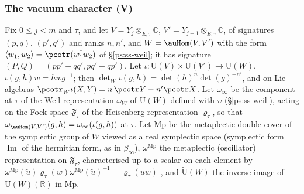\documentclass[10pt]{amsart}
\theoremstyle{definition}
\theoremstyle{remark}
\newcommand{\C}{\mathbb C}
\newcommand{\R}{\mathbb R}
\newcommand{\Iml}{\operatorname{Im}}
\providecommand{\auU}{\mathrm U}
\begin{document}
\subsubsection{The vacuum character (V)}\label{pco:ss-V}
Fix $0\le j<m$ and $\tau$, and let $V=Y_j\otimes_{E,\tau}\C$, $V'=Y_{j+1}\otimes_{E,\tau}\C$, of
signatures $(p,q)$, $(p',q')$ and ranks $n,n'$, and $W=\auHom(V,V')$ with the form
$\langle w_1,w_2\rangle=\pcotr(w_1^\dagger w_2)$ of \S\ref{ps:ss-weil}; it has signature
$(P,Q)=(pp'+qq',pq'+qp')$. Let $\iota\colon\auU(V)\times\auU(V')\to\auU(W)$, $\iota(g,h)w=hwg^{-1}$;
then $\det_W\iota(g,h)=\det(h)^n\det(g)^{-n'}$, and on Lie algebras
$\pcotr_W\iota(X,Y)=n\,\pcotr Y-n'\pcotr X$. Let $\omega_\infty$ be the component at $\tau$ of the
Weil representation $\omega_W$ of $\auU(W)$ defined with $\upsilon$ (\S\ref{ps:ss-weil}), acting on
the Fock space $\mathfrak F_\tau$ of the Heisenberg representation $\varrho_\tau$, so that
$\omega_{\auHom(V,V')}(g,h)=\omega_\infty(\iota(g,h))$ at $\tau$. Let $\mathrm{Mp}$ be the metaplectic
double cover of the symplectic group of $W$ viewed as a real symplectic space (symplectic form
$\Iml$ of the hermitian form, as in $\beta_\infty$), $\omega^{\mathrm{Mp}}$ the metaplectic
(oscillator) representation on $\mathfrak F_\tau$, characterised up to a scalar on each element by
$\omega^{\mathrm{Mp}}(\tilde u)\varrho_\tau(w)\omega^{\mathrm{Mp}}(\tilde u)^{-1}=\varrho_\tau(uw)$
\cite[Th\'eor\`eme~1 and no.~34]{WeilActa}, and $\widetilde{\auU}(W)$ the inverse image of $\auU(W)(\R)$ in $\mathrm{Mp}$.
\end{document}
